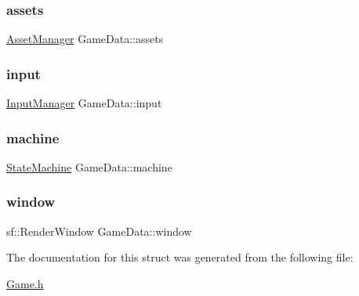 \subsubsection{\texorpdfstring{assets}{assets}}
{\footnotesize\ttfamily \mbox{\hyperlink{classAssetManager}{Asset\+Manager}} Game\+Data\+::assets}

\mbox{\label{structGameData_abdfb34b80f7627eebbe484144dd9b589}} 
\subsubsection{\texorpdfstring{input}{input}}
{\footnotesize\ttfamily \mbox{\hyperlink{classInputManager}{Input\+Manager}} Game\+Data\+::input}

\mbox{\label{structGameData_a8dfa448b18baef58877cd0365f4c1978}} 
\subsubsection{\texorpdfstring{machine}{machine}}
{\footnotesize\ttfamily \mbox{\hyperlink{classStateMachine}{State\+Machine}} Game\+Data\+::machine}

\mbox{\label{structGameData_ad3ebf49a95d78b14047b92b20d39b810}} 
\subsubsection{\texorpdfstring{window}{window}}
{\footnotesize\ttfamily sf\+::\+Render\+Window Game\+Data\+::window}



The documentation for this struct was generated from the following file\+:\begin{DoxyCompactItemize}
\item 
\mbox{\hyperlink{Game_8h}{Game.\+h}}\end{DoxyCompactItemize}
